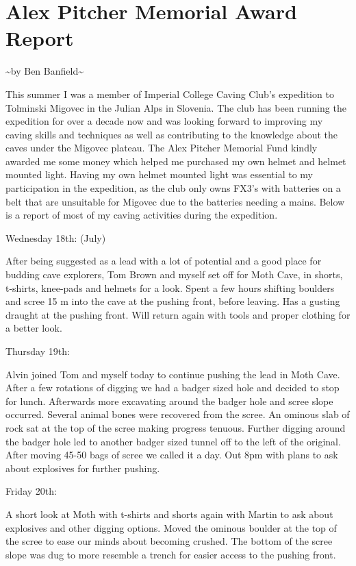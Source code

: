 \hypertarget{alex-pitcher-memorial-award-report}{%
\section{Alex Pitcher Memorial Award
Report}\label{alex-pitcher-memorial-award-report}}

\textasciitilde{}by Ben Banfield\textasciitilde{}

This summer I was a member of Imperial College Caving Club's expedition
to Tolminski Migovec in the Julian Alps in Slovenia. The club has been
running the expedition for over a decade now and was looking forward to
improving my caving skills and techniques as well as contributing to the
knowledge about the caves under the Migovec plateau. The Alex Pitcher
Memorial Fund kindly awarded me some money which helped me purchased my
own helmet and helmet mounted light. Having my own helmet mounted light
was essential to my participation in the expedition, as the club only
owns FX3's with batteries on a belt that are unsuitable for Migovec due
to the batteries needing a mains. Below is a report of most of my caving
activities during the expedition.

Wednesday 18th: (July)

After being suggested as a lead with a lot of potential and a good place
for budding cave explorers, Tom Brown and myself set off for Moth Cave,
in shorts, t-shirts, knee-pads and helmets for a look. Spent a few hours
shifting boulders and scree 15 m into the cave at the pushing front,
before leaving. Has a gusting draught at the pushing front. Will return
again with tools and proper clothing for a better look.

Thursday 19th:

Alvin joined Tom and myself today to continue pushing the lead in Moth
Cave. After a few rotations of digging we had a badger sized hole and
decided to stop for lunch. Afterwards more excavating around the badger
hole and scree slope occurred. Several animal bones were recovered from
the scree. An ominous slab of rock sat at the top of the scree making
progress tenuous. Further digging around the badger hole led to another
badger sized tunnel off to the left of the original. After moving 45-50
bags of scree we called it a day. Out 8pm with plans to ask about
explosives for further pushing.

Friday 20th:

A short look at Moth with t-shirts and shorts again with Martin to ask
about explosives and other digging options. Moved the ominous boulder at
the top of the scree to ease our minds about becoming crushed. The
bottom of the scree slope was dug to more resemble a trench for easier
access to the pushing front.

